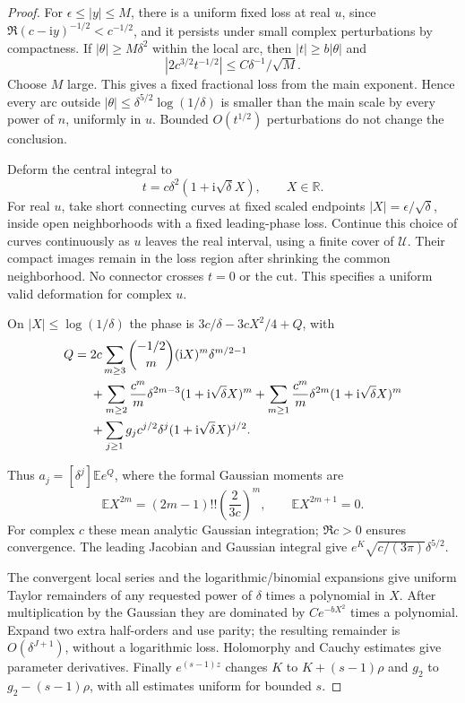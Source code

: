 \documentclass[11pt]{article}
\theoremstyle{remark}\newtheorem{remark}[theorem]{Remark}
\newcommand{\E}{\mathbb E}
\newcommand{\ii}{\mathrm i}
\begin{document}
\begin{proof}
For $\epsilon\le |y|\le M$, there is a uniform fixed loss at real $u$, since
$\Re(c-\ii y)^{-1/2}<c^{-1/2}$, and it persists under small complex perturbations by compactness. If $|\theta|\ge M\delta^2$ within the local arc, then $|t|\ge b|\theta|$ and
\[
 |2c^{3/2}t^{-1/2}|\le C\delta^{-1}/\sqrt M.
\]
Choose $M$ large. This gives a fixed fractional loss from the main exponent. Hence every arc outside
$|\theta|\le\delta^{5/2}\log(1/\delta)$ is smaller than the main scale by every power of $n$, uniformly in $u$. Bounded $O(t^{1/2})$ perturbations do not change the conclusion.

Deform the central integral to
\begin{equation}\label{vav:rf:eq:vertical}
 t=c\delta^2(1+\ii\sqrt\delta X),\qquad X\in\mathbb R.
\end{equation}
For real $u$, take short connecting curves at fixed scaled endpoints $|X|=\epsilon/\sqrt\delta$, inside open neighborhoods with a fixed leading-phase loss. Continue this choice of curves continuously as $u$ leaves the real interval, using a finite cover of $\mathcal U$. Their compact images remain in the loss region after shrinking the common neighborhood. No connector crosses $t=0$ or the cut. This specifies a uniform valid deformation for complex $u$.

\begin{samepage}
On $|X|\le\log(1/\delta)$ the phase is $3c/\delta-3cX^2/4+Q$, with
\begin{align}\label{vav:rf:eq:Q}
 Q={}&2c\sum_{m\ge3}\binom{-1/2}{m}(\ii X)^m\delta^{m/2-1}\notag\\
 &+\sum_{m\ge2}\frac{c^m}{m}\delta^{2m-3}(1+\ii\sqrt\delta X)^m
  +\sum_{m\ge1}\frac{c^m}{m}\delta^{2m}(1+\ii\sqrt\delta X)^m\notag\\
 &+\sum_{j\ge1}g_jc^{j/2}\delta^j(1+\ii\sqrt\delta X)^{j/2}.
\end{align}
\end{samepage}
Thus $a_j=[\delta^j]\E e^Q$, where the formal Gaussian moments are
\[
 \E X^{2m}=(2m-1)!!\left(\frac{2}{3c}\right)^m,\qquad \E X^{2m+1}=0.
\]
For complex $c$ these mean analytic Gaussian integration; $\Re c>0$ ensures convergence. The leading Jacobian and Gaussian integral give $e^K\sqrt{c/(3\pi)}\delta^{5/2}$.

The convergent local series and the logarithmic/binomial expansions give uniform Taylor remainders of any requested power of $\delta$ times a polynomial in $X$. After multiplication by the Gaussian they are dominated by $C e^{-bX^2}$ times a polynomial. Expand two extra half-orders and use parity; the resulting remainder is $O(\delta^{J+1})$, without a logarithmic loss. Holomorphy and Cauchy estimates give parameter derivatives. Finally $e^{(s-1)z}$ changes $K$ to $K+(s-1)\rho$ and $g_2$ to $g_2-(s-1)\rho$, with all estimates uniform for bounded $s$.
\end{proof}
\end{document}
